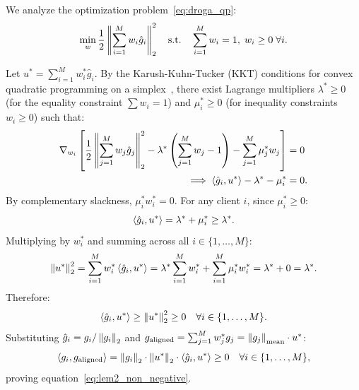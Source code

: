\begin{IEEEproof}
We analyze the optimization problem~\eqref{eq:droga_qp}:
\begin{equation}
\min_{w} \frac{1}{2} \left\lVert\sum_{i=1}^M w_i \hat{g}_i\right\rVert_2^2 \quad \text{s.t.} \quad \sum_{i=1}^M w_i = 1, \; w_i \ge 0 \; \forall i.
\end{equation}

Let $u^* = \sum_{i=1}^M w_i^* \hat{g}_i$. By the Karush-Kuhn-Tucker (KKT) conditions for convex quadratic programming on a simplex~\cite{boyd2004convex}, there exist Lagrange multipliers $\lambda^* \ge 0$ (for the equality constraint $\sum w_i = 1$) and $\mu_i^* \ge 0$ (for inequality constraints $w_i \ge 0$) such that:
\begin{align}
\nabla_{w_i} \left[ \frac{1}{2} \left\lVert\sum_{j=1}^M w_j \hat{g}_j\right\rVert_2^2 - \lambda^* \left(\sum_{j=1}^M w_j - 1\right) - \sum_{j=1}^M \mu_j^* w_j \right] &= 0 \notag \\
\implies \left\langle\hat{g}_i,u^*\right\rangle - \lambda^* - \mu_i^* &= 0.
\end{align}
By complementary slackness, $\mu_i^* w_i^* = 0$. For any client $i$, since $\mu_i^* \ge 0$:
\begin{equation}
\left\langle\hat{g}_i,u^*\right\rangle = \lambda^* + \mu_i^* \ge \lambda^*.
\end{equation}
Multiplying by $w_i^*$ and summing across all $i \in \{1, \dots, M\}$:
\begin{equation}
\left\lVert u^*\right\rVert_2^2 = \sum_{i=1}^M w_i^* \left\langle\hat{g}_i,u^*\right\rangle = \lambda^* \sum_{i=1}^M w_i^* + \sum_{i=1}^M \mu_i^* w_i^* = \lambda^* + 0 = \lambda^*.
\end{equation}
Therefore:
\begin{equation}
\left\langle\hat{g}_i,u^*\right\rangle \ge \left\lVert u^*\right\rVert_2^2 \ge 0 \quad \forall i \in \{1, \dots, M\}.
\end{equation}
Substituting $\hat{g}_i = g_i / \left\lVert g_i\right\rVert_2$ and $g_{\text{aligned}} = \sum_{j=1}^M w_j^* g_j = \left\lVert g_j\right\rVert_{\text{mean}} \cdot u^*$:
\begin{equation}
\left\langle g_i,g_{\text{aligned}}\right\rangle = \left\lVert g_i\right\rVert_2 \cdot \left\lVert u^*\right\rVert_2 \cdot \left\langle\hat{g}_i,u^*\right\rangle \ge 0 \quad \forall i \in \{1, \dots, M\},
\end{equation}
proving equation~\eqref{eq:lem2_non_negative}.


\end{IEEEproof}
